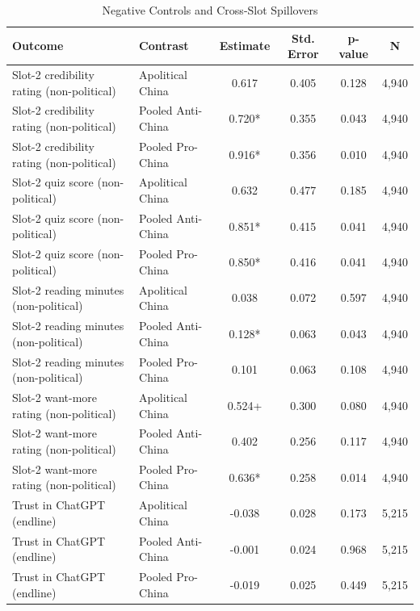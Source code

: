\begin{table}[H]
\centering
\caption{Negative Controls and Cross-Slot Spillovers}
\label{tab:negative_controls}
\footnotesize
\begin{threeparttable}
\begin{tabular}{llcccc}
\toprule
Outcome & Contrast & Estimate & Std. Error & p-value & N \\
\midrule
Slot-2 credibility rating (non-political) & Apolitical China & 0.617 & 0.405 & 0.128 & 4,940 \\
Slot-2 credibility rating (non-political) & Pooled Anti-China & 0.720* & 0.355 & 0.043 & 4,940 \\
Slot-2 credibility rating (non-political) & Pooled Pro-China & 0.916* & 0.356 & 0.010 & 4,940 \\
Slot-2 quiz score (non-political) & Apolitical China & 0.632 & 0.477 & 0.185 & 4,940 \\
Slot-2 quiz score (non-political) & Pooled Anti-China & 0.851* & 0.415 & 0.041 & 4,940 \\
Slot-2 quiz score (non-political) & Pooled Pro-China & 0.850* & 0.416 & 0.041 & 4,940 \\
Slot-2 reading minutes (non-political) & Apolitical China & 0.038 & 0.072 & 0.597 & 4,940 \\
Slot-2 reading minutes (non-political) & Pooled Anti-China & 0.128* & 0.063 & 0.043 & 4,940 \\
Slot-2 reading minutes (non-political) & Pooled Pro-China & 0.101 & 0.063 & 0.108 & 4,940 \\
Slot-2 want-more rating (non-political) & Apolitical China & 0.524+ & 0.300 & 0.080 & 4,940 \\
Slot-2 want-more rating (non-political) & Pooled Anti-China & 0.402 & 0.256 & 0.117 & 4,940 \\
Slot-2 want-more rating (non-political) & Pooled Pro-China & 0.636* & 0.258 & 0.014 & 4,940 \\
Trust in ChatGPT (endline) & Apolitical China & -0.038 & 0.028 & 0.173 & 5,215 \\
Trust in ChatGPT (endline) & Pooled Anti-China & -0.001 & 0.024 & 0.968 & 5,215 \\
Trust in ChatGPT (endline) & Pooled Pro-China & -0.019 & 0.025 & 0.449 & 5,215 \\
\bottomrule
\end{tabular}
\begin{tablenotes}[flushleft]
\footnotesize

\end{tablenotes}
\end{threeparttable}
\end{table}
